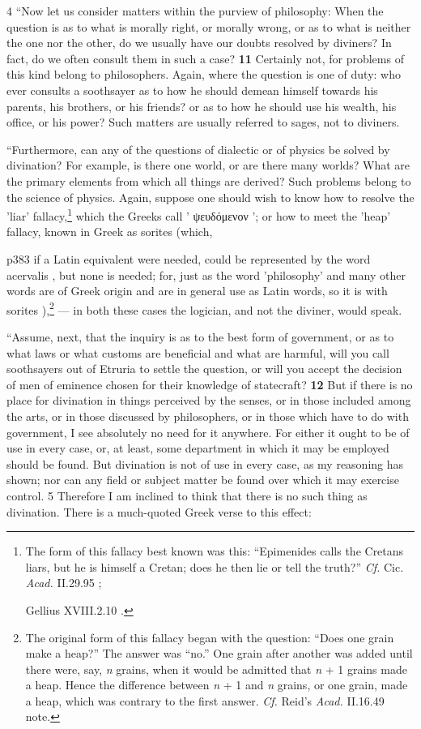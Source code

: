 4
``Now let us consider matters within the purview of philosophy: When the question is as to what is morally right, or morally wrong, or as to what is neither the one nor the other, do we usually have our doubts resolved by diviners? In fact, do we often consult them in such a case? \textbf{11} Certainly not, for problems of this kind belong to philosophers. Again, where the question is one of duty: who ever consults a soothsayer as to how he should demean himself towards his parents, his brothers, or his friends? or as to how he should use his wealth, his office, or his power? Such matters are usually referred to sages, not to diviners.

``Furthermore, can any of the questions of dialectic or of physics be solved by divination? For example, is there one world, or are there many worlds? What are the primary elements from which all things are derived? Such problems belong to the science of physics. Again, suppose one should wish to know how to resolve the 'liar' fallacy,\texthebrew{}\footnote{The form of this fallacy best known was this: ``Epimenides calls the Cretans liars, but he is himself a Cretan; does he then lie or tell the truth?'' \emph{Cf.} Cic. \emph{Acad.} II.29.95 ;

Gellius XVIII.2.10 .

} which the Greeks call ' \textgreek{ψευδόμενον} '; or how to meet the 'heap' fallacy, known in Greek as sorites (which,

p383 if a Latin equivalent were needed, could be represented by the word acervalis , but none is needed; for, just as the word 'philosophy' and many other words are of Greek origin and are in general use as Latin words, so it is with sorites ),\texthebrew{}\footnote{The original form of this fallacy began with the question: ``Does one grain make a heap?'' The answer was ``no.'' One grain after another was added until there were, say, \emph{n} grains, when it would be admitted that \emph{n} + 1 grains made a heap. Hence the difference between \emph{n} + 1 and \emph{n} grains, or one grain, made a heap, which was contrary to the first answer. \emph{Cf.} Reid's \emph{Acad.} II.16.49 note.

} \texthebrew{—} in both these cases the logician, and not the diviner, would speak.

``Assume, next, that the inquiry is as to the best form of government, or as to what laws or what customs are beneficial and what are harmful, will you call soothsayers out of Etruria to settle the question, or will you accept the decision of men of eminence chosen for their knowledge of statecraft? \textbf{12} But if there is no place for divination in things perceived by the senses, or in those included among the arts, or in those discussed by philosophers, or in those which have to do with government, I see absolutely no need for it anywhere. For either it ought to be of use in every case, or, at least, some department in which it may be employed should be found. But divination is not of use in every case, as my reasoning has shown; nor can any field or subject matter be found over which it may exercise control. 5 Therefore I am inclined to think that there is no such thing as divination. There is a much-quoted Greek verse to this effect:

